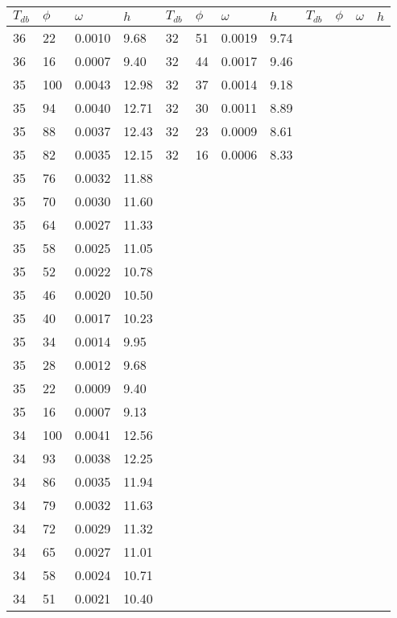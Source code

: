 \begin{tabular}{llll|llll|llll}
 \toprule 
\(T_{db}\) & \(\phi\) & \(\omega\) & \(h\) & \(T_{db}\) & \(\phi\) & \(\omega\) & \(h\) & \(T_{db}\) & \(\phi\) & \(\omega\) & \(h\)  \\ \midrule 
36 & 22 & 0.0010 & 9.68 & 32 & 51 & 0.0019 & 9.74 &  &  &  & \\
36 & 16 & 0.0007 & 9.40 & 32 & 44 & 0.0017 & 9.46 &  &  &  & \\
35 & 100 & 0.0043 & 12.98 & 32 & 37 & 0.0014 & 9.18 &  &  &  & \\
35 & 94 & 0.0040 & 12.71 & 32 & 30 & 0.0011 & 8.89 &  &  &  & \\
35 & 88 & 0.0037 & 12.43 & 32 & 23 & 0.0009 & 8.61 &  &  &  & \\
35 & 82 & 0.0035 & 12.15 & 32 & 16 & 0.0006 & 8.33 &  &  &  & \\
35 & 76 & 0.0032 & 11.88 &  &  &  &  &  &  &  & \\
35 & 70 & 0.0030 & 11.60 &  &  &  &  &  &  &  & \\
35 & 64 & 0.0027 & 11.33 &  &  &  &  &  &  &  & \\
35 & 58 & 0.0025 & 11.05 &  &  &  &  &  &  &  & \\
35 & 52 & 0.0022 & 10.78 &  &  &  &  &  &  &  & \\
35 & 46 & 0.0020 & 10.50 &  &  &  &  &  &  &  & \\
35 & 40 & 0.0017 & 10.23 &  &  &  &  &  &  &  & \\
35 & 34 & 0.0014 & 9.95 &  &  &  &  &  &  &  & \\
35 & 28 & 0.0012 & 9.68 &  &  &  &  &  &  &  & \\
35 & 22 & 0.0009 & 9.40 &  &  &  &  &  &  &  & \\
35 & 16 & 0.0007 & 9.13 &  &  &  &  &  &  &  & \\
34 & 100 & 0.0041 & 12.56 &  &  &  &  &  &  &  & \\
34 & 93 & 0.0038 & 12.25 &  &  &  &  &  &  &  & \\
34 & 86 & 0.0035 & 11.94 &  &  &  &  &  &  &  & \\
34 & 79 & 0.0032 & 11.63 &  &  &  &  &  &  &  & \\
34 & 72 & 0.0029 & 11.32 &  &  &  &  &  &  &  & \\
34 & 65 & 0.0027 & 11.01 &  &  &  &  &  &  &  & \\
34 & 58 & 0.0024 & 10.71 &  &  &  &  &  &  &  & \\
34 & 51 & 0.0021 & 10.40 &  &  &  &  &  &  &  & \\

\end{tabular}
